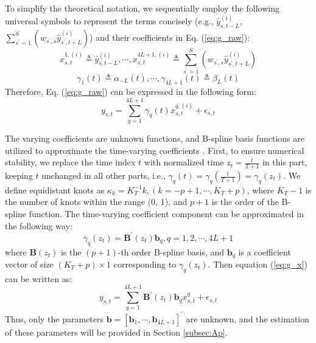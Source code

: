 \documentclass[3p,11pt,authoryear]{elsarticle}
\begin{document}
To simplify the theoretical notation, we sequentially employ the following universal symbols to represent the terms concisely (e.g., $\hat{y}_{s,t-L}^{(i)}$, $\sum_{s^{\prime} =1}^{S} (w_{s^{\prime}, s}  \hat{y}_{s^{\prime}, t+L}^{(i)})$) and their coefficients in Eq. (\ref{eq:g_raw}):
\begin{equation}\label{eq:abbr_x}
	x_{s,t}^{1, (i)} \triangleq \hat{y}_{s,t-L}^{(i)}, \cdots, 
	x_{s,t}^{4L+1, (i)} \triangleq \sum_{s^{\prime} =1}^{S} (w_{s^{\prime}, s}  \hat{y}_{s^{\prime}, t+L}^{(i)})
\end{equation}
\begin{equation}\label{eq:abbr_gamma}
	\gamma_1(t) \triangleq \alpha_{-L}(t), \cdots,
	\gamma_{4L+1}(t) \triangleq \beta_{L}(t)
\end{equation}
Therefore, Eq. (\ref{eq:g_raw}) can be expressed in the following form:
\begin{equation}\label{eq:g_x}
	y_{s,t} = \sum_{q=1}^{4L+1} \gamma_q(t) x_{s,t}^{q, (i)} + \epsilon_{s,t}
\end{equation}

The varying coefficients are unknown functions, and B-spline basis functions are utilized to approximate the time-varying coefficients \citep{cox1972numerical, de1972calculating, luo2023using}. First, to ensure numerical stability, we replace the time index $t$ with normalized time $z_t = \frac{t}{T+1}$ in this part, keeping $t$ unchanged in all other parts, i.e., $\gamma_{q}(t) = \gamma_{q}(\frac{t}{T+1}) = \gamma_{q}(z_t)$. We define equidistant knots as $\kappa_k=K_T^{-1}k, (k=-p+1,\cdots,K_T+p)$, where $K_T-1$ is the number of knots within the range (0, 1), and $p+1$ is the order of the B-spline function. The time-varying coefficient component can be approximated in the following way: 
\begin{equation}
	\gamma_q(z_t) = \boldsymbol{B}^{\prime}(z_t) \boldsymbol{b}_q,  q=1,2,\cdots,4L+1
\end{equation}
where $\boldsymbol{B}(z_t)$ is the $(p+1)$-th order B-spline basis, and $\boldsymbol{b}_q$ is a coefficient vector of size $(K_T+p)\times1$ corresponding to $\gamma_q(z_t)$. Then equation (\ref{eq:g_x}) can be written as:
\begin{equation}\label{eq:g_bs}
	y_{s,t} = \sum_{q=1}^{4L+1} \boldsymbol{B}^{\prime}(z_t) \boldsymbol{b}_q x_{s,t}^q + \epsilon_{s,t}
\end{equation}
Thus, only the parameters $\boldsymbol{b} = [\boldsymbol{b}_1,\cdots,\boldsymbol{b}_{4L+1}]^{\prime}$ are unknown, and the estimation of these parameters will be provided in Section \ref{subsec:Ap}. 
\end{document}
